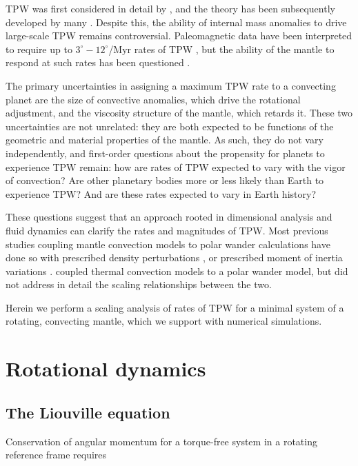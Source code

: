 \documentclass[extra,mreferee]{gji}
\begin{document}
TPW was first considered in detail by \citet{darwin1887influence}, and the theory has been subsequently developed by many \citep[e.g.][]{munk1960rotation, goldreich1969some, ricard1993polar}. 
Despite this, the ability of internal mass anomalies to drive large-scale TPW remains controversial. 
Paleomagnetic data have been interpreted to require up to $3^\circ-12^\circ$/Myr rates of TPW \citep{mitchell2011sutton}, but the ability of the mantle to respond at such rates has been questioned \citep{tsai2007theoretical}.

The primary uncertainties in assigning a maximum TPW rate to a convecting planet are the size of convective anomalies, which drive the rotational adjustment, and the viscosity structure of the mantle, which retards it. 
These two uncertainties are not unrelated: they are both expected to be functions of the geometric and material properties of the mantle.
As such, they do not vary independently, and first-order questions about the propensity for planets to experience TPW remain: how are rates of TPW expected to vary with the vigor of convection? 
Are other planetary bodies more or less likely than Earth to experience TPW?  And are these rates expected to vary in Earth history?

These questions suggest that an approach rooted in dimensional analysis and fluid dynamics can clarify the rates and magnitudes of TPW.
Most previous studies coupling mantle convection models to polar wander calculations have done so with prescribed density perturbations \citep[e.g.][]{greff2004upwelling}, or prescribed moment of inertia variations \citep[e.g.][]{tsai2007theoretical, creveling2012mechanisms}. 
\citet{richards1999polar} coupled thermal convection models to a polar wander model, but did not address in detail the scaling relationships between the two.

Herein we perform a scaling analysis of rates of TPW for a minimal system of a rotating, convecting mantle,  which we support with numerical simulations.

\section{Rotational dynamics}
\label{sec:rotational_dynamics}

\subsection{The Liouville equation}
\label{sec:liouville}
Conservation of angular momentum for a torque-free system in a rotating reference frame requires
\end{document}
